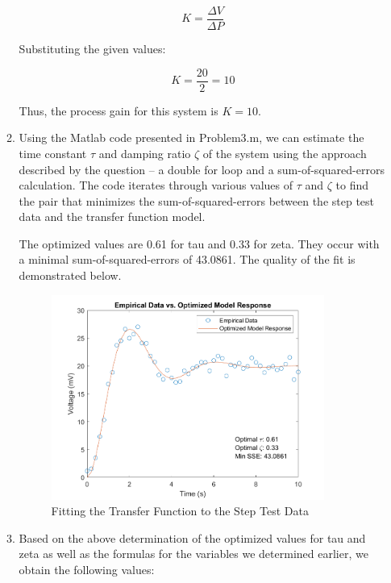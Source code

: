 \documentclass[12pt]{article}
\begin{document}
\begin{enumerate}
\begin{enumerate}
    \[
    K = \frac{\Delta V}{\Delta P}
    \]

    Substituting the given values:

    \[
    K = \frac{20}{2} = 10
    \]

    Thus, the process gain for this system is \(K = 10\).

    \item
    Using the Matlab code presented in Problem3.m, we can estimate the time constant \(\tau\) and damping ratio \(\zeta\) of the system using the approach described by the question -- a double for loop and a sum-of-squared-errors calculation. The code iterates through various values of \(\tau\) and \(\zeta\) to find the pair that minimizes the sum-of-squared-errors between the step test data and the transfer function model. \linebreak
    
    The optimized values are 0.61 for tau and 0.33 for zeta. They occur with a minimal sum-of-squared-errors of 43.0861. The quality of the fit is demonstrated below.

    \begin{figure}[H]
      \centering
      \includegraphics[width=0.9\textwidth]{Figures/figure3-3.png}
      \caption{Fitting the Transfer Function to the Step Test Data}
      \label{fig:figure33}
    \end{figure}

    \item 
    Based on the above determination of the optimized values for tau and zeta as well as the formulas for the variables we determined earlier, we obtain the following values:


\end{enumerate}
\end{enumerate}
\end{document}
